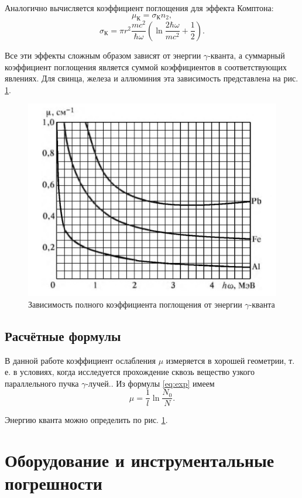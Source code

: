 \documentclass[a4paper]{article}
\begin{document}
Аналогично вычисляется коэффициент поглощения для эффекта Комптона:
\begin{equation*}\label{key}
	\mu_К = \sigma_К n_2,
\end{equation*}
\begin{equation*}\label{key}
	\sigma_К = \pi r^2 \frac{m c^2}{\hbar \omega} \left( \ln \frac{2 \hbar \omega}{m c^2} +\frac{1}{2}\right).
\end{equation*}

Все эти эффекты сложным образом зависят от энергии $ \gamma $-кванта, а суммарный коэффициент поглощения является суммой коэффициентов в соответствующих явлениях. Для свинца, железа и аллюминия эта зависимость представлена на рис. \ref{fig:screenshot1}.

\begin{figure}
	\centering
	\includegraphics[width=0.5\linewidth]{Screenshot_1}
	\caption{Зависимость полного коэффициента поглощения от энергии $ \gamma $-кванта}
	\label{fig:screenshot1}
\end{figure}

\subsection{Расчётные формулы}

В данной работе коэффициент ослабления $ \mu $ измеряется в хорошей
геометрии, т. е. в условиях, когда исследуется прохождение сквозь вещество узкого параллельного пучка $ \gamma $-лучей.. Из формулы \eqref{eq:exp} имеем
\begin{equation}\label{eq:mu}
	\mu = \frac{1}{l}\ln \frac{N_0}{N}.
\end{equation}

Энергию кванта можно определить по рис. \ref{fig:screenshot1}.

\section{Оборудование и инструментальные погрешности}
\end{document}
